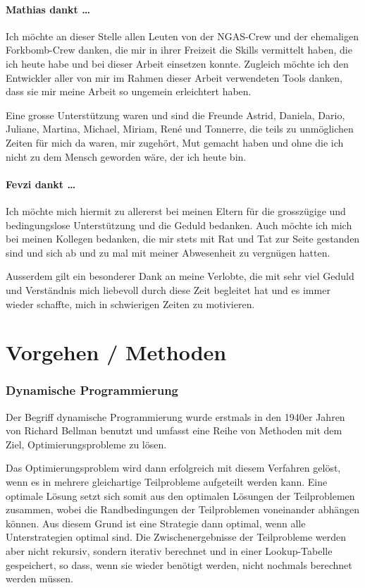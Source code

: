 \documentclass[a4paper,10pt]{article}
\begin{document}
\subsection{Mathias dankt \dots}
Ich möchte an dieser Stelle allen Leuten von der NGAS-Crew und der ehemaligen
Forkbomb-Crew danken, die mir in ihrer Freizeit die Skills vermittelt haben,
die ich heute habe und bei dieser Arbeit einsetzen konnte. Zugleich möchte ich
den Entwickler aller von mir im Rahmen dieser Arbeit verwendeten Tools danken,
dass sie mir meine Arbeit so ungemein erleichtert haben.

Eine grosse Unterstützung waren und sind die Freunde Astrid, Daniela, Dario,
Juliane, Martina, Michael, Miriam, René und Tonnerre, die teils zu unmöglichen
Zeiten für mich da waren, mir zugehört, Mut gemacht haben und ohne die ich
nicht zu dem Mensch geworden wäre, der ich heute bin.

\subsection{Fevzi dankt \dots}
Ich möchte mich hiermit zu allererst bei meinen Eltern für die grosszügige und 
bedingungslose Unterstützung und die Geduld bedanken. Auch möchte ich mich 
bei meinen Kollegen bedanken, die mir stets mit Rat und Tat zur Seite gestanden sind und
sich ab und zu mal mit meiner Abwesenheit zu vergnügen hatten. 

Ausserdem gilt ein besonderer Dank an meine Verlobte, die mit sehr viel Geduld und
Verständnis mich liebevoll durch diese Zeit begleitet hat und es immer wieder schaffte,
mich in schwierigen Zeiten zu motivieren.


\newpage
\part{Vorgehen / Methoden}
\section{Dynamische Programmierung}
Der Begriff dynamische Programmierung\cite{wiki:dynamicProgramming} wurde erstmals in den 1940er Jahren von
Richard Bellman benutzt und umfasst eine Reihe von Methoden mit dem Ziel,
Optimierungsprobleme zu lösen. 

Das Optimierungsproblem wird dann erfolgreich mit diesem Verfahren
gelöst, wenn es in mehrere gleichartige Teilprobleme aufgeteilt werden
kann. Eine optimale Lösung setzt sich somit aus den optimalen Lösungen
der Teilproblemen zusammen, wobei die Randbedingungen der Teilproblemen
voneinander abhängen können.  Aus diesem Grund ist eine Strategie dann
optimal, wenn alle Unterstrategien optimal sind. Die Zwischenergebnisse
der Teilprobleme werden aber nicht rekursiv, sondern iterativ berechnet
und in einer Lookup-Tabelle gespeichert, so dass, wenn sie wieder benötigt
werden, nicht nochmals berechnet werden müssen.
\end{document}

